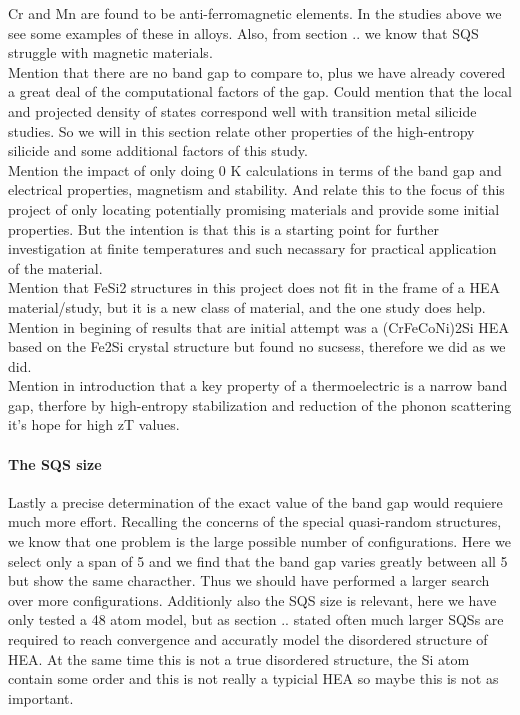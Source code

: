 Cr and Mn are found to be anti-ferromagnetic elements. In the studies above we see some examples of these in alloys. Also, from section .. we know that SQS struggle with magnetic materials. \\

Mention that there are no band gap to compare to, plus we have already covered a great deal of the computational factors of the gap. Could mention that the local and projected density of states correspond well with transition metal silicide studies. So we will in this section relate other properties of the high-entropy silicide and some additional factors of this study. \\

Mention the impact of only doing 0 K calculations in terms of the band gap and electrical properties, magnetism and stability. And relate this to the focus of this project of only locating potentially promising materials and provide some initial properties. But the intention is that this is a starting point for further investigation at finite temperatures and such necassary for practical application of the material. \\

Mention that FeSi2 structures in this project does not fit in the frame of a HEA material/study, but it is a new class of material, and the one study does help. Mention in begining of results that are initial attempt was a (CrFeCoNi)2Si HEA based on the Fe2Si crystal structure but found no sucsess, therefore we did as we did. \\

Mention in introduction that a key property of a thermoelectric is a narrow band gap, therfore by high-entropy stabilization and reduction of the phonon scattering it's hope for high zT values. \\


\paragraph{The SQS size}

Lastly a precise determination of the exact value of the band gap would requiere much more effort. Recalling the concerns of the special quasi-random structures, we know that one problem is the large possible number of configurations. Here we select only a span of 5 and we find that the band gap varies greatly between all 5 but show the same characther. Thus we should have performed a larger search over more configurations. Additionly also the SQS size is relevant, here we have only tested a 48 atom model, but as section .. stated often much larger SQSs are required to reach convergence and accuratly model the disordered structure of HEA. At the same time this is not a true disordered structure, the Si atom contain some order and this is not really a typicial HEA so maybe this is not as important.

